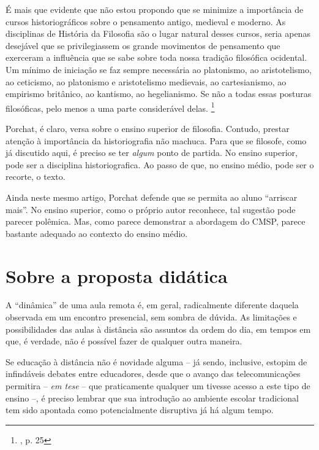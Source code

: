 \documentclass[12pt,a4paper]{article}
\newenvironment{citac}{\begin{addmargin}[4cm]{1em} \footnotesize}{\normalfont \end{addmargin}}
\begin{document}
	\begin{citac}
	É mais que evidente que não estou propondo que se minimize
	a importância de cursos historiográficos sobre o pensamento antigo,
	medieval e moderno. As disciplinas de História da Filosofia são o lugar
	natural desses cursos, seria apenas desejável que se privilegiassem os
	grande movimentos de pensamento que exerceram a influência que se
	sabe sobre toda nossa tradição filosófica ocidental. Um mínimo de
	iniciação se faz sempre necessária ao platonismo, ao aristotelismo, ao
	ceticismo, ao platonismo e aristotelismo medievais, ao cartesianismo,
	ao empirismo britânico, ao kantismo, ao hegelianismo. Se não a todas
	essas posturas filosóficas, pelo menos a uma parte considerável delas. 
		\footnote{\cite{porchat}, p. 25}
	\end{citac}

	Porchat, é claro, versa sobre o ensino superior de filosofia. 
	Contudo, prestar atenção à importância da historiografia não 
	machuca. Para que se filosofe, como já discutido aqui, é preciso 
	se ter \textit{algum} ponto de partida. No ensino superior, pode 
	ser a disciplina historiografica. Ao passo de que, no ensino 
	médio, pode ser o recorte, o texto. 

	Ainda neste mesmo artigo, Porchat defende que se permita ao aluno 
	“arriscar mais”. No ensino superior, como o próprio autor reconhece, 
	tal sugestão pode parecer polêmica. Mas, como parece demonstrar 
	a abordagem do CMSP, parece bastante adequado ao contexto do 
	ensino médio. 

	\newpage
	
	\section{Sobre a proposta didática}
	
	A “dinâmica” de uma aula remota é, em geral, radicalmente diferente 
	daquela observada em um encontro presencial, sem sombra de dúvida. 
	As limitações e possibilidades das aulas à distância são assuntos da 
	ordem do dia, em tempos em que, é verdade, não é possível fazer de 
	qualquer outra maneira.

	Se educação à distância não é novidade alguma -- já sendo, inclusive, 
	estopim de infindáveis debates entre educadores, desde que o avanço 
	das telecomunicações permitira -- \textit{em tese} -- que praticamente 
	qualquer um tivesse acesso 
	a este tipo de ensino --, é preciso lembrar que sua introdução ao 
	ambiente escolar tradicional tem sido apontada como potencialmente 
	disruptiva já há algum tempo. 
\end{document}
